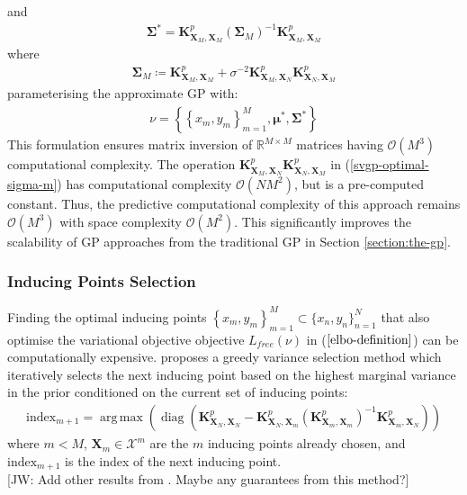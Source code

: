 \documentclass{article}
\newcommand{\jw}[1]{{\color{gray} [JW: #1]}}
\newcommand{\diag}{\operatorname{diag}}
\DeclareMathOperator*{\argmax}{arg\,max}
\numberwithin{equation}{section}
\begin{document}
and
\begin{align}
    \label{svgp-optimal-covariance}
    \mathbf{\Sigma}^* = \mathbf{K}^p_{\mathbf{X}_M, \mathbf{X}_M}  \left(\mathbf{\Sigma}_M\right)^{-1}\mathbf{K}^p_{\mathbf{X}_M, \mathbf{X}_M} 
\end{align}
where 
\begin{align}
    \mathbf{\Sigma}_M \coloneqq \mathbf{K}^p_{\mathbf{X}_M, \mathbf{X}_M}  + \sigma^{-2}\mathbf{K}^p_{\mathbf{X}_M, \mathbf{X}_N} \mathbf{K}^p_{\mathbf{X}_N, \mathbf{X}_M} 
    \label{svgp-optimal-sigma-m}
\end{align}
parameterising the approximate GP with:
\begin{align}
    \nu = \left\{ \left\{ x_m, y_m\right\}_{m=1}^M, \boldsymbol{\mu}^*, \mathbf{\Sigma}^*\right\}
    \label{titsias-svgp-parameters}
\end{align}
This formulation ensures matrix inversion of $\mathbb{R}^{M \times M}$ matrices having $\mathcal{O}\left(M^3\right)$ computational complexity. The operation $\mathbf{K}^p_{\mathbf{X}_M, \mathbf{X}_N} \mathbf{K}^p_{\mathbf{X}_N, \mathbf{X}_M} $ in (\ref{svgp-optimal-sigma-m}) has computational complexity $\mathcal{O}\left(NM^2\right)$, but is a pre-computed constant. Thus, the predictive computational complexity of this approach remains $\mathcal{O}\left(M^3\right)$ with space complexity $\mathcal{O}\left(M^2\right)$. This significantly improves the scalability of GP approaches from the traditional GP in Section \ref{section:the-gp}.

\subsubsection{Inducing Points Selection}
Finding the optimal inducing points $\left\{x_m, y_m\right\}_{m=1}^{M} \subset \{x_n, y_n\}_{n=1}^{N}$ that also optimise the variational objective objective $L_{free}(\nu)$ in ($\ref{elbo-definition}$) can be computationally expensive. \cite{burt2020convergence} proposes a greedy variance selection method which iteratively selects the next inducing point based on the highest marginal variance in the prior conditioned on the current set of inducing points:
\begin{align}
    \label{greedy-varaince-selection}
    \text{index}_{m+1} = \argmax \left(\diag \left(\mathbf{K}^p_{\mathbf{X}_N, \mathbf{X}_N} - \mathbf{K}^p_{\mathbf{X}_N, \mathbf{X}_{m}} \left(\mathbf{K}^p_{\mathbf{X}_{m}, \mathbf{X}_{m}}\right)^{-1}\mathbf{K}^p_{\mathbf{X}_{m}, \mathbf{X}_N}\right)\right)
\end{align}
where $m < M$, $\mathbf{X}_{m} \in \mathcal{X}^m$ are the $m$ inducing points already chosen, and $\text{index}_{m+1}$ is the index of the next inducing point.
\\\jw{Add other results from \cite{burt2020convergence}. Maybe any guarantees from this method?}
\end{document}
